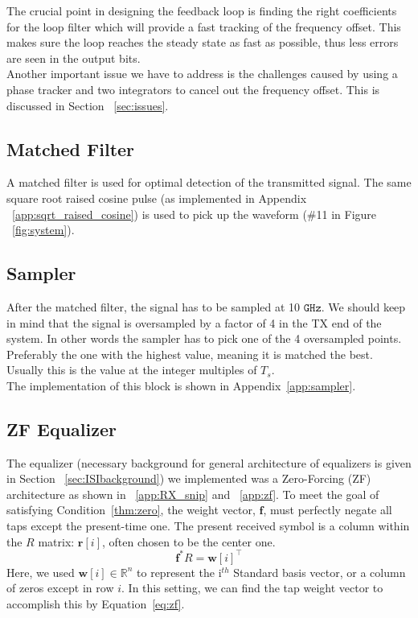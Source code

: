 \documentclass[]{article}
\begin{document}
The crucial point in designing the feedback loop is finding the right coefficients for the loop filter which will provide a fast tracking of the frequency offset. This makes sure the loop reaches the steady state as fast as possible, thus less errors are seen in the output bits. \\

Another important issue we have to address is the challenges caused by using a phase tracker and two integrators to cancel out the frequency offset. This is discussed in Section ~\ref{sec:issues}.


\subsection{Matched Filter}
\label{sec:matched}
A matched filter is used for optimal detection of the transmitted signal. The same square root raised cosine pulse (as implemented in Appendix ~\ref{app:sqrt_raised_cosine}) is used to pick up the waveform (\#11 in Figure ~\ref{fig:system}).

\subsection{Sampler}
\label{sec:sample}
After the matched filter, the signal has to be sampled at 10 $\mathtt{GHz}$.  We should keep in mind that the signal is oversampled by a factor of 4 in the TX end of the system. In other words the sampler has to pick one of the 4 oversampled points. Preferably the one with the highest value, meaning it is matched the best. Usually this is the value at the integer multiples of  $T_s$. \\

The implementation of this block is shown in Appendix~\ref{app:sampler}.

\subsection{ZF Equalizer}
\label{sec:equal}
The equalizer (necessary background for general architecture of equalizers is given in Section ~\ref{sec:ISIbackground}) we implemented was a Zero-Forcing (ZF) architecture as shown in ~\ref{app:RX_snip} and ~\ref{app:zf}. To meet the goal of satisfying Condition~\ref{thm:zero}, the weight vector, $\mathbf{f}$, must perfectly negate all taps except the present-time one.  The present received symbol is a column within the $R$ matrix: $\mathbf{r}[i]$, often chosen to be the center one.  
$$ \mathbf{f}^{\ast}R = \mathbf{w}[i]^{\top} $$
Here, we used  $\mathbf{w} [i] \in \mathbb{R}^n$ to represent the i$^{th}$ Standard basis vector, or a column of zeros except in row $i$.  In this setting, we can find the tap weight vector to accomplish this by Equation~\ref{eq:zf}. 
\end{document}
